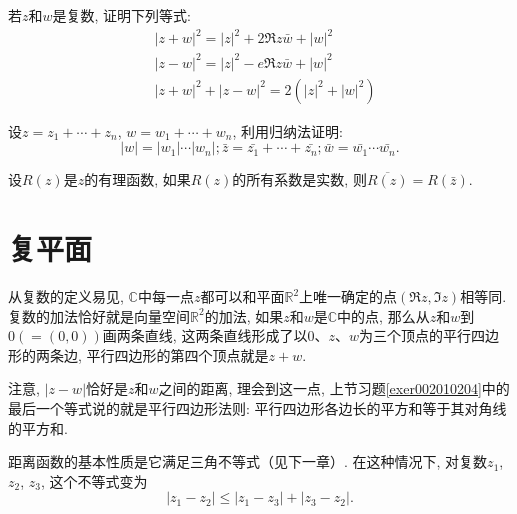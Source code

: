 \begin{exercise}\label{exer002010204}
若$z$和$w$是复数, 证明下列等式: 
\[
\begin{aligned}
&|z+w|^2 = |z|^2 + 2\Re{z\bar{w}} + |w|^2 \\
&|z-w|^2 = |z|^2 - e\Re{z\bar{w}} + |w|^2 \\
&|z+w|^2 + |z-w|^2 = 2(|z|^2+|w|^2)
\end{aligned}
\]
\end{exercise}

\begin{exercise}
设$z=z_1+\cdots+z_n$, $w= w_1+\cdots+w_n$, 利用归纳法证明: 
\[
|w| = |w_1|\cdots|w_n|; \bar{z}=\bar{z_1}+\cdots+\bar{z_n}; \bar{w}=\bar{w_1}\cdots\bar{w_n}.
\]
\end{exercise}

\begin{exercise}
设$R(z)$是$z$的有理函数, 如果$R(z)$的所有系数是实数, 则$\overline{R(z)} = R(\bar{z})$. 
\end{exercise}

\section{复平面}\label{subsection0020103}
从复数的定义易见, $\mathbb{C}$中每一点$z$都可以和平面$\mathbb{R}^2$上唯一确定的点$(\Re{z}, \Im{z})$相等同. 复数的加法恰好就是向量空间$\mathbb{R}^2$的加法, 如果$z$和$w$是$\mathbb{C}$中的点, 那么从$z$和$w$到$0(=(0,0))$画两条直线, 这两条直线形成了以$0$、$z$、$w$为三个顶点的平行四边形的两条边, 平行四边形的第四个顶点就是$z+w$. 

注意, $|z-w|$恰好是$z$和$w$之间的距离, 理会到这一点, 上节习题\ref{exer002010204}中的最后一个等式说的就是平行四边形法则: 平行四边形各边长的平方和等于其对角线的平方和. 

距离函数的基本性质是它满足三角不等式（见下一章）. 在这种情况下, 对复数$z_1$, $z_2$, $z_3$, 这个不等式变为
\[
|z_1-z_2| \le |z_1-z_3| + |z_3-z_2|.
\]

